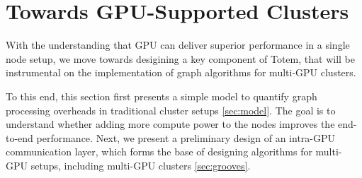 \documentclass{acm_proc_article-sp}[12pt]
\begin{document}



\section{Towards GPU-Supported Clusters}
\label{sec:cluster}
With the understanding that GPU can deliver superior performance in a single node setup, we move towards desigining a key component of {\sc Totem}, that will be instrumental on the implementation of graph algorithms for multi-GPU clusters. 

To this end, this section first presents a simple model to quantify graph processing overheads in traditional cluster setups \ref{sec:model}. The goal is to understand whether adding more compute power to the nodes improves the end-to-end performance. Next, we present a preliminary design of an intra-GPU communication layer, which forms the base of designing algorithms for multi-GPU setups, including multi-GPU clusters \ref{sec:grooves}.








\end{document}
